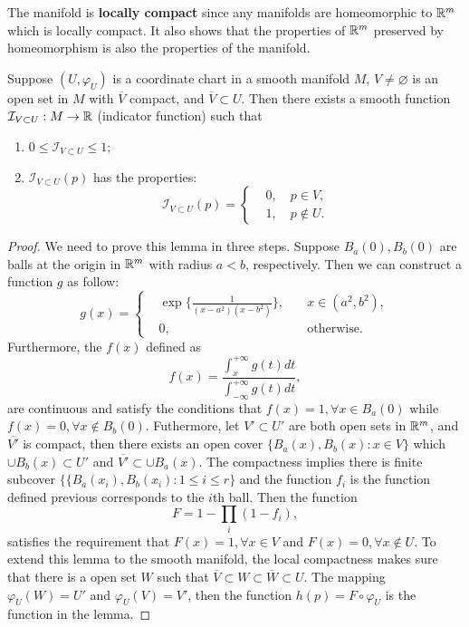 The manifold is \textbf{locally compact} since any manifolds are homeomorphic to $\mathbb{R}^m$ which is locally compact. It also shows that the properties of $\mathbb{R}^m$ preserved by homeomorphism is also the properties of the manifold. 

\begin{lemma}
Suppose $(U,\varphi_U)$ is a coordinate chart in a smooth manifold $M$, $V\ne\varnothing$ is an open set in $M$ with $\overline{V}$ compact, and $\overline{V}\subset U$. Then there exists a smooth function $\mathcal{I}_{V\subset U}:M\to\mathbb{R}$ (indicator function) such that
\begin{enumerate}
\item $0\le \mathcal{I}_{V\subset U}\le 1$;
\item $\mathcal{I}_{V\subset U}(p)$ has the properties:
\begin{equation}
\mathcal{I}_{V\subset U}(p)=\left\{
\begin{aligned}
&0,\quad p\in V,\\
&1,\quad p\notin U.
\end{aligned}
\right.
\end{equation}
\end{enumerate}
\end{lemma}\label{lemma:openset_indicator}

\begin{proof}
We need to prove this lemma in three steps.
Suppose $B_a(0),B_b(0)$ are balls at the origin in $\mathbb{R}^m$ with radius $a<b$, respectively. Then we can construct a function $g$ as follow:
\begin{equation}
g(x)=\left\{
\begin{aligned}
&\exp\Bigg\{\frac{1}{(x-a^2)(x-b^2)}\Bigg\},&\quad x\in (a^2,b^2),\\
&0 ,&\quad \text{otherwise}.
\end{aligned}
\right.
\end{equation}
Furthermore, the $f(x)$ defined as
\begin{equation}
f(x)=\frac{\int_x^{+\infty} g(t)dt}{\int_{-\infty}^{+\infty}g(t)dt},
\end{equation}
are continuous and satisfy the conditions that $f(x)=1,\forall x\in B_a(0)$ while $f(x)=0,\forall x\notin B_b(0)$.
Futhermore, let $V'\subset U'$ are both open sets in $\mathbb{R}^m$, and $\overline{V'}$ is compact, then there exists an open cover $\{B_a(x),B_b(x):x\in V\}$ which $\cup B_b(x)\subset U'$ and $\overline{V'}\subset \cup B_a(x)$. The compactness implies there is finite subcover $\{\{B_a(x_i),B_b(x_i):1\le i\le r\}$ and the function $f_i$ is the function defined previous corresponds to the $i$th ball. Then the function
\begin{equation}
F=1-\prod_i(1-f_i),
\end{equation}
satisfies the requirement that $F(x)=1,\forall x\in V$ and $F(x)=0,\forall x\notin U$. To extend this lemma to the smooth manifold, the local compactness makes sure that there is a open set $W$ such that $\overline{V}\subset W\subset\overline{W}\subset U$. The mapping $\varphi_U(W)=U'$ and $\varphi_U(V)=V'$, then the function $h(p)=F\circ\varphi_U$ is the function in the lemma.
\end{proof}


